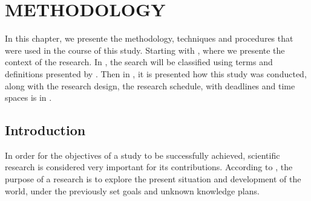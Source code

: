 \chapter{METHODOLOGY}\label{methodology}


In this chapter, we presente the methodology, techniques and procedures that were used in the course of this study. 
Starting with , where we presente the context of the research. 
In , the search will be classified using terms and definitions presented by . 
Then in , it is presented how this study was conducted, along with the research design, the research schedule, with deadlines and time spaces is in .

\section{Introduction}\label{sec:met-intro}


In order for the objectives of a study to be successfully achieved, scientific research is considered very important for its contributions. 
According to \cite{pingping_yulan_2013}, the purpose of a research is to explore the present situation and development of the world, under the previously set goals and unknown knowledge plans.


